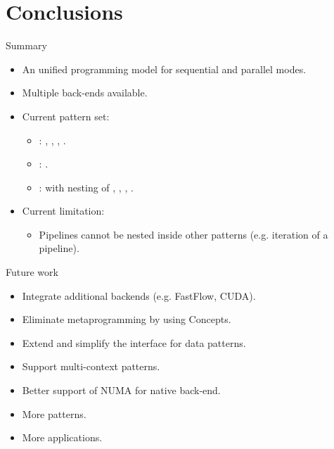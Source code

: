 \section{Conclusions}

\begin{frame}[t]{Summary}
\begin{itemize}
  \item An unified programming model for sequential and parallel modes.
  \item Multiple back-ends available.
  \item Current pattern set:
    \begin{itemize}
      \item {}: , , , .
      \item {}: .
      \item {}:  with nesting of , ,
            , .
    \end{itemize}
  \item Current limitation:
    \begin{itemize}
      \item Pipelines cannot be nested inside other patterns (e.g. iteration of a pipeline).
    \end{itemize}
\end{itemize}
\end{frame}

\begin{frame}[t]{Future work}
\begin{itemize}
  \item Integrate additional backends (e.g. FastFlow, CUDA).
  \item Eliminate metaprogramming by using Concepts.
  \item Extend and simplify the interface for data patterns.
  \item Support multi-context patterns.
  \item Better support of NUMA for native back-end. 
  \item More patterns.
  \item More applications.
\end{itemize}
\end{frame}


